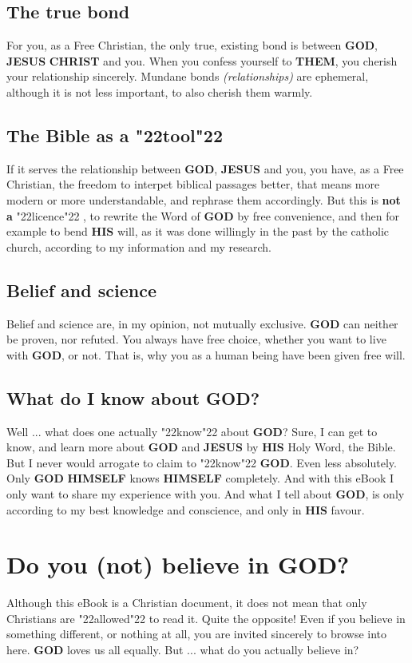 \documentclass[12pt,a4paper]{article}
\newcommand{\Christ}[0]{\textbf{CHRIST}}
\newcommand{\God}[0]{\textbf{GOD}}
\newcommand{\Himself}[0]{\textbf{HIMSELF}}
\newcommand{\His}[0]{\textbf{HIS}}
\newcommand{\Jesus}[0]{\textbf{JESUS}}
\newcommand{\Them}[0]{\textbf{THEM}}
\newcommand{\q}[1]{\char"22{#1}\char"22 }
\begin{document}
	\subsection{The true bond}
		For you,
		as a Free Christian,
		the only true,
		existing bond is between {\God},
		{\Jesus} {\Christ} and you.
		When you confess yourself to {\Them},
		you cherish your relationship sincerely.
		Mundane bonds \textit{(relationships)} are ephemeral,
		although it is not less important,
		to also cherish them warmly.
			
	\subsection{The Bible as a \q{tool}}
		If it serves the relationship between {\God},
		{\Jesus} and you,
		you have,
		as a Free Christian,
		the freedom to interpet biblical passages better,
		that means more modern or more understandable,
		and rephrase them accordingly.
		But this is \textbf{not a} \q{licence},
		to rewrite the Word of {\God} by free convenience,
		and then for example to bend {\His} will,
		as it was done willingly in the past by the catholic church,
		according to my information and my research.
		
	\subsection{Belief and science}
		Belief and science are,
		in my opinion,
		not mutually exclusive.
		{\God} can neither be proven,
		nor refuted.
		You always have free choice,
		whether you want to live with {\God},
		or not.
		That is,
		why you as a human being have been given free will.

	\subsection{What do I know about {\God}?}
		Well ... what does one actually \q{know} about {\God}?
		Sure,
		I can get to know,
		and learn more about {\God} and {\Jesus} by {\His} Holy Word,
		the Bible.
		But I never would arrogate to claim to \q{know} {\God}.
		Even less absolutely.
		Only {\God} {\Himself} knows {\Himself} completely.
		And with this eBook I only want to share my experience with you.
		And what I tell about {\God},
		is only according to my best knowledge and conscience,
		and only in {\His} favour.
		
	\newpage
	\section{Do you (not) believe in {\God}?}
		Although this eBook is a Christian document,
		it does not mean that only Christians are \q{allowed} to read it.
		Quite the opposite!
		Even if you believe in something different,
		or nothing at all,
		you are invited sincerely to browse into here.
		{\God} loves us all equally.
		But ... what do you actually believe in?
\end{document}
